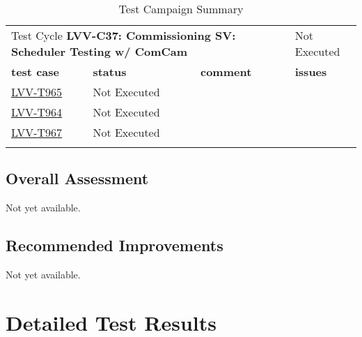 \documentclass[DM,lsstdraft,STR,toc]{lsstdoc}
\begin{document}
\begin{longtable}{p{2cm}p{2.5cm}p{9cm}p{2.5cm}}
\begin{minipage}[]{9cm}
    \medskip
    \end{minipage}
    &
    \\\hline

  \multicolumn{3}{l}{ Test Cycle {\bf LVV-C37: Commissioning SV: Scheduler Testing w/ ComCam
 }} & Not Executed \\\hline

  {\bf \footnotesize test case} & {\bf \footnotesize status} & {\bf \footnotesize comment} & {\bf \footnotesize issues} \\\toprule

\href{https://jira.lsstcorp.org/secure/Tests.jspa#/testCase/LVV-T965}{LVV-T965}
    & Not Executed &
    \begin{minipage}[]{9cm}
    \smallskip
    
    \medskip
    \end{minipage}
    &
    \\\hline
\href{https://jira.lsstcorp.org/secure/Tests.jspa#/testCase/LVV-T964}{LVV-T964}
    & Not Executed &
    \begin{minipage}[]{9cm}
    \smallskip
    
    \medskip
    \end{minipage}
    &
    \\\hline
\href{https://jira.lsstcorp.org/secure/Tests.jspa#/testCase/LVV-T967}{LVV-T967}
    & Not Executed &
    \begin{minipage}[]{9cm}
    \smallskip
    
    \medskip
    \end{minipage}
    &
    \\\hline
\caption{Test Campaign Summary}
\label{table:summary}
\end{longtable}

\subsection{Overall Assessment}
\label{sect:overallassessment}

Not yet available.

\subsection{Recommended Improvements}
\label{sect:recommendations}

Not yet available.

\newpage
\section{Detailed Test Results}
\label{sect:detailedtestresults}
\end{document}
